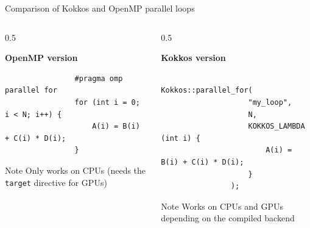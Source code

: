 \documentclass[
    aspectratio=169,
    \createHandout
]{beamer}
\begin{document}

\begin{frame}[fragile]{Comparison of Kokkos and OpenMP parallel loops}
    \begin{columns}[T]
        \begin{column}{0.5\linewidth}
            \begin{center}
                \textbf{OpenMP version}
            \end{center}
            \begin{verbatim}
                #pragma omp parallel for
                for (int i = 0; i < N; i++) {
                    A(i) = B(i) + C(i) * D(i);
                }
            \end{verbatim}
            \begin{block}{Note}
                Only works on CPUs (needs the \texttt{target} directive for GPUs)
            \end{block}
        \end{column}
        \pause
        \begin{column}{0.5\linewidth}
            \begin{center}
                \textbf{Kokkos version}
            \end{center}
            \begin{verbatim}
                Kokkos::parallel_for(
                    "my_loop",
                    N,
                    KOKKOS_LAMBDA (int i) {
                        A(i) = B(i) + C(i) * D(i);
                    }
                );
            \end{verbatim}

            \vspace{-0.75em}

            \begin{block}{Note}
                Works on CPUs and GPUs depending on the compiled backend
            \end{block}
        \end{column}
    \end{columns}
\end{frame}

\end{document}
